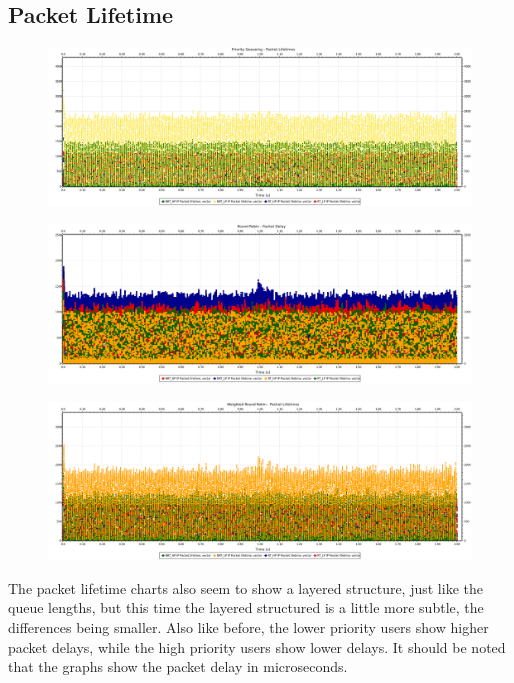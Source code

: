 \documentclass[12pt]{article}
\begin{document}
        \subsection{Packet Lifetime}
        \begin{figure}[htbp!]
            \centering
            \includegraphics[width=\textwidth]{images/PriorityQueueing_pali.png}
        \end{figure}
        \begin{figure}[htbp!]
            \centering
            \includegraphics[width=\textwidth]{images/RoundRobin_pali.png}
        \end{figure}
        \pagebreak
        \begin{figure}[htbp!]
            \centering
            \includegraphics[width=\textwidth]{images/WeightedRoundRobin_pali.png}
        \end{figure}

        The packet lifetime charts also seem to show a layered structure, just like the queue lengths, but this time the layered structured is a little more subtle, the differences being smaller. Also like before, the lower priority users show higher packet delays, while the high priority users show lower delays. It should be noted that the graphs show the packet delay in microseconds.
\end{document}
